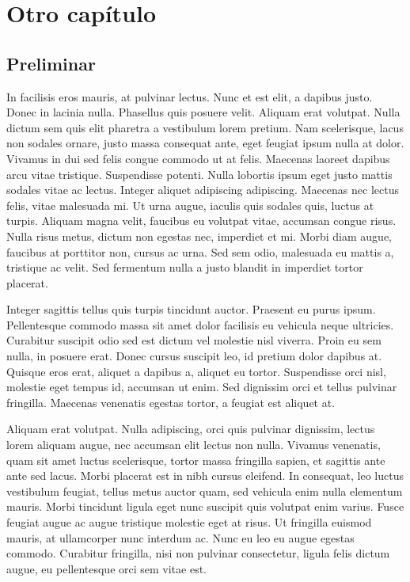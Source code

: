\documentclass{ritsi/book}
\begin{document}
\chapter{Otro capítulo}

\section{Preliminar}

In facilisis eros mauris, at pulvinar lectus. Nunc et est elit, a dapibus justo. Donec in lacinia nulla. Phasellus quis posuere velit. Aliquam erat volutpat. Nulla dictum sem quis elit pharetra a vestibulum lorem pretium. Nam scelerisque, lacus non sodales ornare, justo massa consequat ante, eget feugiat ipsum nulla at dolor. Vivamus in dui sed felis congue commodo ut at felis. Maecenas laoreet dapibus arcu vitae tristique. 
Suspendisse potenti. Nulla lobortis ipsum eget justo mattis sodales vitae ac lectus. Integer aliquet adipiscing adipiscing. Maecenas nec lectus felis, vitae malesuada mi. Ut urna augue, iaculis quis sodales quis, luctus at turpis. Aliquam magna velit, faucibus eu volutpat vitae, accumsan congue risus. Nulla risus metus, dictum non egestas nec, imperdiet et mi. Morbi diam augue, faucibus at porttitor non, cursus ac urna. Sed sem odio, malesuada eu mattis a, tristique ac velit. Sed fermentum nulla a justo blandit in imperdiet tortor placerat.

Integer sagittis tellus quis turpis tincidunt auctor. Praesent eu purus ipsum. Pellentesque commodo massa sit amet dolor facilisis eu vehicula neque ultricies. Curabitur suscipit odio sed est dictum vel molestie nisl viverra. Proin eu sem nulla, in posuere erat. Donec cursus suscipit leo, id pretium dolor dapibus at. Quisque eros erat, aliquet a dapibus a, aliquet eu tortor. Suspendisse orci nisl, molestie eget tempus id, accumsan ut enim. Sed dignissim orci et tellus pulvinar fringilla. Maecenas venenatis egestas tortor, a feugiat est aliquet at.

Aliquam erat volutpat. Nulla adipiscing, orci quis pulvinar dignissim, lectus lorem aliquam augue, nec accumsan elit lectus non nulla. Vivamus venenatis, quam sit amet luctus scelerisque, tortor massa fringilla sapien, et sagittis ante ante sed lacus. Morbi placerat est in nibh cursus eleifend. In consequat, leo luctus vestibulum feugiat, tellus metus auctor quam, sed vehicula enim nulla elementum mauris. Morbi tincidunt ligula eget nunc suscipit quis volutpat enim varius. Fusce feugiat augue ac augue tristique molestie eget at risus. Ut fringilla euismod mauris, at ullamcorper nunc interdum ac. Nunc eu leo eu augue egestas commodo. Curabitur fringilla, nisi non pulvinar consectetur, ligula felis dictum augue, eu pellentesque orci sem vitae est.
\end{document}
